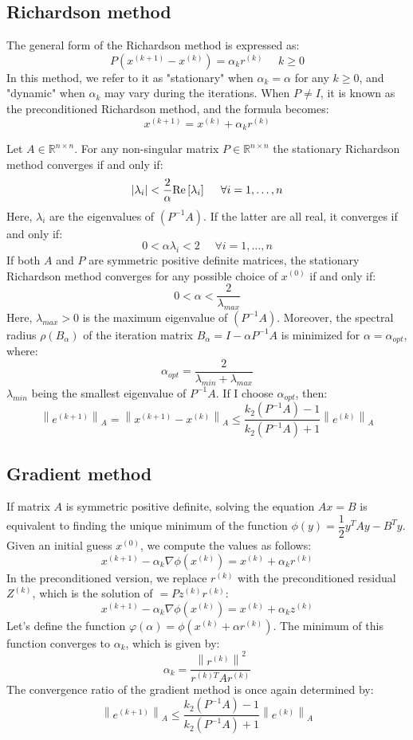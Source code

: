 \documentclass[12pt, a4paper]{report}
\begin{document}
    \subsection{Richardson method}
    The general form of the Richardson method is expressed as:
    \[P(x^{(k+1)}-x^{(k)})=\alpha_kr^{(k)} \:\:\:\:\:\: k \geq 0\]
    In this method, we refer to it as "stationary" when $\alpha_k=\alpha$ for any $k \geq 0$, and "dynamic" when $\alpha_k$ may vary during the iterations. 
    When $P \neq I$, it is known as the preconditioned Richardson method, and the formula becomes:
    \[x^{(k+1)}=x^{(k)}+\alpha_k r^{(k)}\]
    \begin{proposition}
        Let $A \in \mathbb{R}^{n \times n}$. For any non-singular matrix $P \in \mathbb{R}^{n \times n}$ the stationary Richardson method converges if and only if: 
        \[\left\lvert \lambda_i\right\rvert < \dfrac{2}{\alpha} \textnormal{Re}\left[\lambda_i\right] \:\:\:\:\:\:\forall i=1,\dots,n\]
        Here, $\lambda_i$ are the eigenvalues of $(P^{-1}A)$. If the latter are all real, it converges if and only if: 
        \[0 < \alpha\lambda_i<2 \:\:\:\:\:\:\forall i=1,\dots,n\]
        If both $A$ and $P$ are symmetric positive definite matrices, the stationary Richardson method converges for any possible choice of 
        $x^{(0)}$ if and only if: 
        \[0 < \alpha < \dfrac{2}{\lambda_{max}}\]
        Here, $\lambda_{max} >0$ is the maximum eigenvalue of $(P^{-1} A)$. 
        Moreover, the spectral radius $\rho (B_{\alpha})$ of the iteration matrix $B_{\alpha}=I-\alpha P^{-1}A$ is minimized for $\alpha=\alpha_{opt}$, where: 
        \[\alpha_{opt}=\dfrac{2}{\lambda_{min}+\lambda_{max}}\]
        $\lambda_{min}$ being the smallest eigenvalue of $P^{-1}A$. 
        If I choose $\alpha_{opt}$, then: 
        \[\left\lVert e^{(k+1)}\right\rVert_A= \left\lVert x^{(k+1)}-x^{(k)}\right\rVert_A \leq \dfrac{k_2(P^{-1}A)-1}{k_2(P^{-1}A)+1}\left\lVert e^{(k)}\right\rVert_A\]
    \end{proposition}
    
    \subsection{Gradient method}
    If matrix $A$ is symmetric positive definite, solving the equation $Ax=B$ is equivalent to finding the unique minimum of the function $\phi(y)=\dfrac{1}{2}y^TAy-B^Ty$. 
    Given an initial guess $x^{(0)}$, we compute the values as follows:
    \[x^{(k+1)}-\alpha_{k}\nabla\phi(x^{(k)})=x^{(k)}+\alpha_kr^{(k)}\]
    In the preconditioned version, we replace $r^{(k)}$ with the preconditioned residual $Z^{(k)}$, which is the solution of $=Pz^{(k)}r^{(k)}$: 
    \[x^{(k+1)}-\alpha_{k}\nabla\phi(x^{(k)})=x^{(k)}+\alpha_kz^{(k)}\]
    Let's define the function $\varphi(\alpha)=\phi(x^{(k)}+\alpha r^{(k)})$. 
    The minimum of this function converges to $\alpha_k$, which is given by:
    \[\alpha_k=\dfrac{\left\lVert r^{(k)} \right\rVert^2}{r^{(k)T}Ar^{(k)}}\]
    The convergence ratio of the gradient method is once again determined by:
    \[\left\lVert e^{(k+1)}\right\rVert_A\leq \dfrac{k_2(P^{-1}A)-1}{k_2(P^{-1}A)+1}\left\lVert e^{(k)}\right\rVert_A\]
\end{document}
